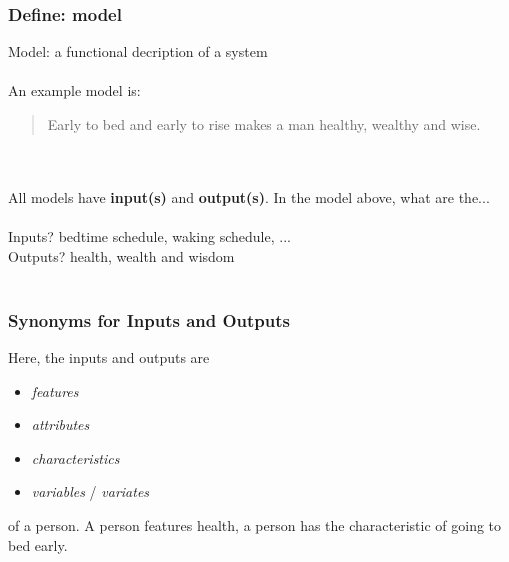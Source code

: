 \documentclass[handout]{beamer}
\begin{document}
\begin{frame}\frametitle{Define: model}

Model: a functional decription of a system  \pause \\~\\ An example model is:

\begin{quotation}
Early to bed and early to rise makes a man healthy, wealthy and wise.
\end{quotation}

 \\~\\

All models have \textbf{input(s)} and \textbf{output(s)}. In the model above, what are the... \\~\\

Inputs? \pause bedtime schedule, waking schedule, ... \\
Outputs? \pause health, wealth and wisdom \\~\\

\end{frame}


\begin{frame}\frametitle{Synonyms for Inputs and Outputs}

\small
Here, the inputs and outputs are 

\begin{itemize}
\item \textit{features} 
\item \textit{attributes} 
\item \textit{characteristics}
\item \textit{variables} / \textit{variates}
\end{itemize}

of a person. A person features health, a person has the characteristic of going to bed early. \\~\\


\end{frame}
\end{document}
